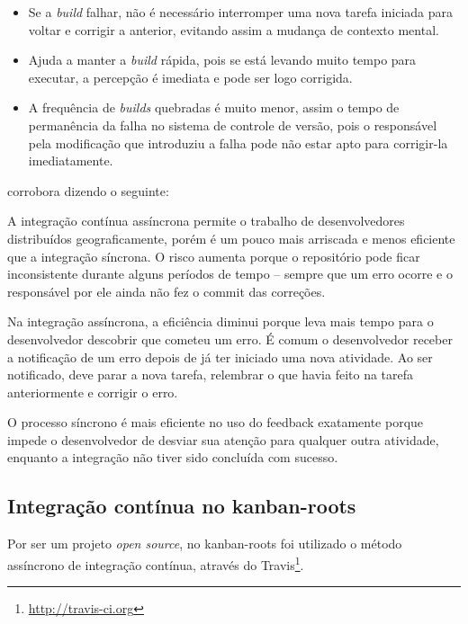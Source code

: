 \begin{itemize}
  \item Se a \textit{build} falhar, não é necessário interromper uma nova tarefa iniciada para voltar e corrigir a anterior, evitando assim a mudança de contexto mental.
  \item Ajuda a manter a \textit{build} rápida, pois se está levando muito tempo para executar, a percepção é imediata e pode ser logo corrigida.
  \item A frequência de \textit{builds} quebradas é muito menor, assim o tempo de permanência da falha no sistema de controle de versão, pois o responsável pela modificação que introduziu a falha pode não estar apto para corrigir-la imediatamente.
\end{itemize}

 corrobora dizendo o seguinte:

\begin{citacao}
A integração contínua assíncrona permite o trabalho de desenvolvedores distribuídos geograficamente, porém é um pouco mais arriscada e menos eficiente que a integração síncrona. O risco aumenta porque o repositório pode ficar inconsistente durante alguns períodos de tempo – sempre que um erro ocorre e o responsável por ele ainda não fez o commit das correções.

Na integração assíncrona, a eficiência diminui porque leva mais tempo para o desenvolvedor descobrir que cometeu um erro. É comum o desenvolvedor receber a notificação de um erro depois de já ter iniciado uma nova atividade. Ao ser notificado, deve parar a nova tarefa, relembrar o que havia feito na tarefa anteriormente e corrigir o erro.

O processo síncrono é mais eficiente no uso do feedback exatamente porque impede o desenvolvedor de desviar sua atenção para qualquer outra atividade, enquanto a integração não tiver sido concluída com sucesso.
\end{citacao}


\subsection{Integração contínua no kanban-roots} %
\label{sub:integracao_continua_no_kanban}

Por ser um projeto \textit{open source}, no kanban-roots foi utilizado o método assíncrono de integração contínua, através do Travis\footnote{\url{http://travis-ci.org}}.

